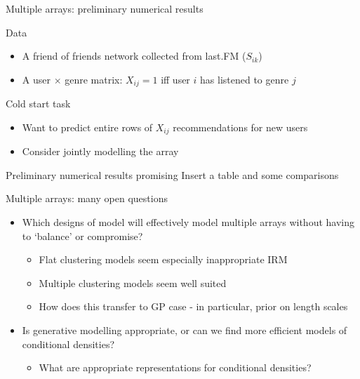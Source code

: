 \begin{frame}{Multiple arrays: preliminary numerical results}
 \begin{block}{Data}
   \begin{itemize}
   \item A friend of friends network collected from last.FM ($S_{ik}$)
   \item A user $\times$ genre matrix: $X_{ij} = 1$ iff user $i$ has listened to genre $j$
   \end{itemize}
 \end{block}
 \begin{block}{Cold start task}
   \begin{itemize}
     \item Want to predict entire rows of $X_{ij}$ \ie recommendations for new users
     \item Consider jointly modelling the array
   \end{itemize}
 \end{block}
 \begin{block}{Preliminary numerical results promising}
   Insert a table and some comparisons
 \end{block}
\end{frame}

\begin{frame}{Multiple arrays: many open questions}
  \begin{block}{}
    \begin{itemize}
      \item Which designs of model will effectively model multiple arrays without having to `balance' or compromise?
      \begin{itemize}
        \item Flat clustering models seem especially inappropriate \eg IRM
        \item Multiple clustering models seem well suited
        \item How does this transfer to GP case - in particular, prior on length scales
      \end{itemize}
      \vspace{\baselineskip}
      \item Is generative modelling appropriate, or can we find more efficient models of conditional densities?
      \begin{itemize}
        \item What are appropriate representations for conditional densities?
      \end{itemize}
    \end{itemize}
  \end{block}
\end{frame}

